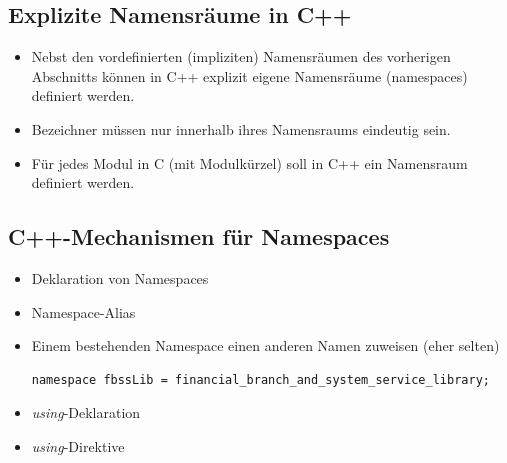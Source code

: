 \subsection{Explizite Namensräume in C++}
\begin{itemize}
	\item Nebst den vordefinierten (impliziten) Namensräumen des vorherigen Abschnitts können in C++ explizit eigene Namensräume (namespaces) definiert werden.
	\item Bezeichner müssen nur innerhalb ihres Namensraums eindeutig sein.
	\item Für jedes Modul in C (mit Modulkürzel) soll in C++ ein Namensraum definiert werden.
\end{itemize}

\subsection{C++-Mechanismen für Namespaces}
\begin{itemize}
	\item Deklaration von Namespaces
	\item Namespace-Alias
	\item[\-] Einem bestehenden Namespace einen anderen Namen zuweisen (eher selten)\\
\begin{minipage}{0.9\linewidth}
\vspace{-\baselineskip}
\begin{lstlisting}
namespace fbssLib = financial_branch_and_system_service_library;
\end{lstlisting}
\end{minipage}
	\item \emph{using}-Deklaration
	\item \emph{using}-Direktive
\end{itemize}

